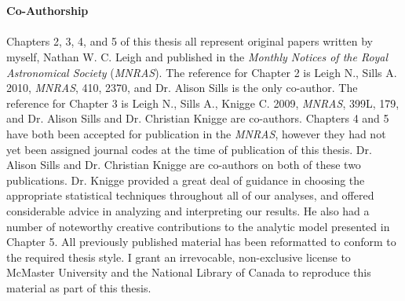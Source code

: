 \thispagestyle{fancy}

\textrm{}\\\\
\noindent\textbf{\huge\textsf{Co-Authorship}}\\\\

\noindent 
Chapters 2, 3, 4, and 5 of this thesis all represent original papers written by
myself, Nathan W. C. Leigh and published in the \textit{Monthly
Notices of the Royal Astronomical Society} (\textit{MNRAS}).  The
reference for Chapter 
2 is Leigh N., Sills A. 2010, \textit{MNRAS}, 410, 2370, and Dr. Alison Sills is
the only co-author.  The reference for Chapter 3 is Leigh N., Sills
A., Knigge C. 2009, \textit{MNRAS}, 399L, 179, and Dr. Alison Sills and
Dr. Christian Knigge are co-authors.  Chapters 4 and 5 have both been
accepted for publication in the \textit{MNRAS}, however they had not
yet been assigned journal codes at the time of publication of this
thesis.  Dr. Alison Sills and Dr. Christian Knigge are co-authors on 
both of these two publications.  Dr. Knigge provided a great deal of guidance in
choosing the appropriate statistical techniques throughout all of our
analyses, and offered
considerable advice in analyzing and interpreting our results.  He
also had a number of noteworthy 
creative contributions to the analytic model presented in Chapter 5.
All previously published material has been 
reformatted to conform to the required thesis 
style.  I grant an irrevocable, non-exclusive license to McMaster
University and the National Library of Canada to reproduce this
material as part of this thesis.
\newpage
\thispagestyle{empty}
\mbox{}